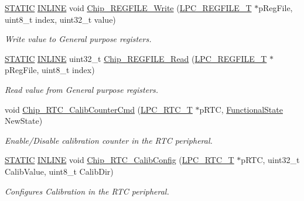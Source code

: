 \begin{DoxyCompactItemize}
\hyperlink{group___l_p_c___types___public___macros_ga10b2d890d871e1489bb02b7e70d9bdfb}{S\+T\+A\+T\+IC} \hyperlink{spifi__18xx__43xx_8h_a2eb6f9e0395b47b8d5e3eeae4fe0c116}{I\+N\+L\+I\+NE} void \hyperlink{group___r_t_c__18_x_x__43_x_x_ga8607152173e77715f7cc42be74799b65}{Chip\+\_\+\+R\+E\+G\+F\+I\+L\+E\+\_\+\+Write} (\hyperlink{struct_l_p_c___r_e_g_f_i_l_e___t}{L\+P\+C\+\_\+\+R\+E\+G\+F\+I\+L\+E\+\_\+T} $\ast$p\+Reg\+File, uint8\+\_\+t index, uint32\+\_\+t value)
\begin{DoxyCompactList}\small\item\em Write value to General purpose registers. \end{DoxyCompactList}\item 
\hyperlink{group___l_p_c___types___public___macros_ga10b2d890d871e1489bb02b7e70d9bdfb}{S\+T\+A\+T\+IC} \hyperlink{spifi__18xx__43xx_8h_a2eb6f9e0395b47b8d5e3eeae4fe0c116}{I\+N\+L\+I\+NE} uint32\+\_\+t \hyperlink{group___r_t_c__18_x_x__43_x_x_gafdad7b4e551aa7e6d52b49a7a072f4ae}{Chip\+\_\+\+R\+E\+G\+F\+I\+L\+E\+\_\+\+Read} (\hyperlink{struct_l_p_c___r_e_g_f_i_l_e___t}{L\+P\+C\+\_\+\+R\+E\+G\+F\+I\+L\+E\+\_\+T} $\ast$p\+Reg\+File, uint8\+\_\+t index)
\begin{DoxyCompactList}\small\item\em Read value from General purpose registers. \end{DoxyCompactList}\item 
void \hyperlink{group___r_t_c__18_x_x__43_x_x_ga987c9ab06dc2bb157388ddf9159de813}{Chip\+\_\+\+R\+T\+C\+\_\+\+Calib\+Counter\+Cmd} (\hyperlink{struct_l_p_c___r_t_c___t}{L\+P\+C\+\_\+\+R\+T\+C\+\_\+T} $\ast$p\+R\+TC, \hyperlink{group___l_p_c___types___public___types_gac9a7e9a35d2513ec15c3b537aaa4fba1}{Functional\+State} New\+State)
\begin{DoxyCompactList}\small\item\em Enable/\+Disable calibration counter in the R\+TC peripheral. \end{DoxyCompactList}\item 
\hyperlink{group___l_p_c___types___public___macros_ga10b2d890d871e1489bb02b7e70d9bdfb}{S\+T\+A\+T\+IC} \hyperlink{spifi__18xx__43xx_8h_a2eb6f9e0395b47b8d5e3eeae4fe0c116}{I\+N\+L\+I\+NE} void \hyperlink{group___r_t_c__18_x_x__43_x_x_ga4f0a93e9a72f793b5891e2d691a1d35d}{Chip\+\_\+\+R\+T\+C\+\_\+\+Calib\+Config} (\hyperlink{struct_l_p_c___r_t_c___t}{L\+P\+C\+\_\+\+R\+T\+C\+\_\+T} $\ast$p\+R\+TC, uint32\+\_\+t Calib\+Value, uint8\+\_\+t Calib\+Dir)
\begin{DoxyCompactList}\small\item\em Configures Calibration in the R\+TC peripheral. \end{DoxyCompactList}\item 

\end{DoxyCompactItemize}
